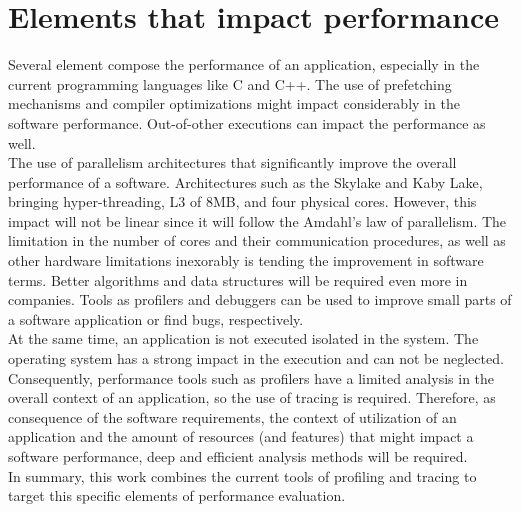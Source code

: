\section{Elements that impact performance}  %
Several element compose the performance of an application, especially in the current programming languages like C and C++. The use of prefetching mechanisms and compiler optimizations might impact considerably in the software performance. Out-of-other executions can impact the performance as well.\\
The use of parallelism architectures that significantly improve the overall performance of a software. Architectures such as the Skylake and Kaby Lake, bringing hyper-threading, L3 of 8MB, and four physical cores. However, this impact will not be linear since it will follow the Amdahl's law of parallelism.
The limitation in the number of cores and their communication procedures, as well as other hardware limitations inexorably is tending the improvement in software terms. Better algorithms and data structures will be required even more in companies. Tools as profilers and debuggers can be used to improve small parts of a software application or find bugs, respectively.\\
At the same time, an application is not executed isolated in the system. The operating system has a strong impact in the execution and can not be neglected. Consequently, performance tools such as profilers have a limited analysis in the overall context of an application, so the use of tracing is required.
Therefore, as consequence of the software requirements, the context of utilization of an application and the amount of resources (and features) that might impact a software performance, deep and efficient analysis methods will be required. \\
In summary, this work combines the current tools of profiling and tracing to target this specific elements of performance evaluation.

